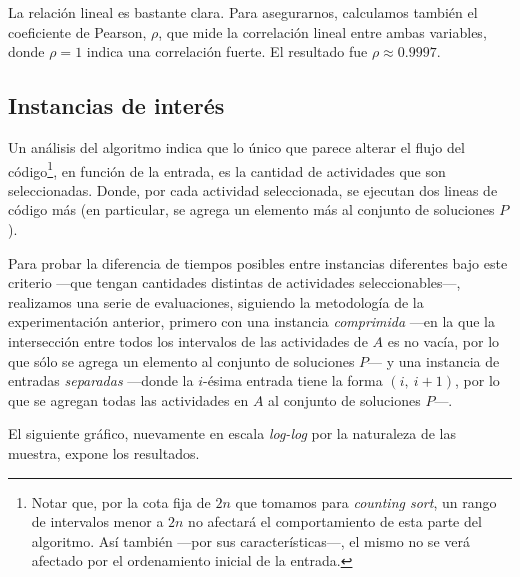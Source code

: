 La relación lineal es bastante clara. Para asegurarnos, calculamos también el coeficiente de Pearson, $\rho$, que mide la correlación lineal entre ambas variables, donde $\rho = 1$ indica una correlación fuerte. El resultado fue $\rho \approx 0.9997$.

\subsection{Instancias de interés}

Un análisis del algoritmo indica que lo único que parece alterar el flujo del código\footnote{Notar que, por la cota fija de $2n$ que tomamos para \textit{counting sort}, un rango de intervalos menor a $2n$ no afectará el comportamiento de esta parte del algoritmo. Así también ---por sus características---, el mismo no se verá afectado por el ordenamiento inicial de la entrada.}, en función de la entrada, es 
la cantidad de actividades que son seleccionadas. Donde, por cada actividad seleccionada, se ejecutan dos lineas de código más (en particular, se agrega un elemento más al conjunto de soluciones $P$). %

Para probar la diferencia de tiempos posibles entre instancias diferentes bajo este criterio ---que tengan cantidades distintas de actividades seleccionables---, realizamos una serie de evaluaciones, siguiendo la metodología de la experimentación anterior, primero con una instancia \textit{comprimida} ---en la que la intersección entre todos los intervalos de las actividades de $A$ es no vacía, por lo que sólo se agrega un elemento al conjunto de soluciones $P$--- y una instancia de entradas \textit{separadas} ---donde la $i$-ésima entrada tiene la forma $(i,\ i+1)$, por lo que se agregan todas las actividades en $A$ al conjunto de soluciones $P$---. 

El siguiente gráfico, nuevamente en escala \textit{log-log} por la naturaleza de las muestra, expone los resultados.

